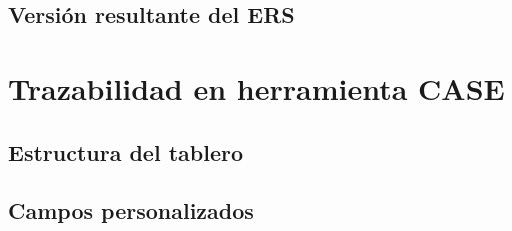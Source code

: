 \documentclass[journal,onecolumn]{IEEEtran}
\newcommand{\guia}[2]{%
	\begin{mdframed}[style=guia]
		\sloppy
		\noindent\textbf{Responsable: #1}\\[2pt]
		#2
	\end{mdframed}
}
\newif\ifguias
\let\guiaoriginal\guia
\renewcommand{\guia}[2]{\ifguias\guiaoriginal{#1}{#2}\fi}
\begin{document}
	\subsection{Versión resultante del ERS}
	
	\guia{Edson (Integrante 1)}{%
		Presentar el historial de revisiones actualizado de v1.0 a v1.1, con una entrada por RFC
		aprobada.\\[3pt]
		Verificación de coherencia (error frecuente que la guía señala): la versión \textbf{v1.1}
		debe aparecer idéntica en la carátula, en el historial de revisiones del ERS, en el
		\texttt{CHANGELOG.md} y en el tag \texttt{baseline-v1.1}. Revisar los cuatro lugares uno
		por uno antes de la entrega.}
	
	\section{Trazabilidad en herramienta CASE}
	
	\subsection{Estructura del tablero}
	
	\guia{Jonathan (Integrante 3)}{%
		Documentar la herramienta elegida (Jira o Trello) con una justificación breve, y la
		estructura: $\geq$~4 Epics por área funcional, $\geq$~15 Stories por requisito funcional,
		$\geq$~2 sub-tareas por criterio de aceptación en al menos 5 historias.\\[3pt]
		Crear el proyecto con el nombre del sistema (MundiPets) y dar acceso a los tres integrantes
		\textbf{y al docente}. El tablero usado como simple lista de tareas baja C4 a nivel 2:
		debe haber jerarquía Epic $\rightarrow$ Story $\rightarrow$ Sub-task.\\[3pt]
		Los mínimos salen solos con el ERS existente: los 25~RF cubren de sobra las $\geq$~15
		Stories, y las Epics pueden seguir las áreas funcionales ya presentes --- registro y perfil
		de mascota, salud y validación documental, adopción, cruza y compatibilidad, comunicación y
		privacidad. Para las sub-tareas, reutilizar los criterios de aceptación en Gherkin que ya
		están en las HU-01 a HU-15 del ERS.}
	
	\subsection{Campos personalizados}
	
\end{document}
